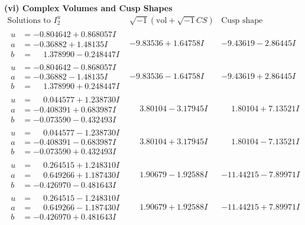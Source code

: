 \documentclass[1p]{elsarticle_modified}
\theoremstyle{definition}
\newcommand{\I}{\sqrt{-1}}
\begin{document}
\newpage\flushleft \textbf{(vi) Complex Volumes and Cusp Shapes}
$$\begin{array}{c|c|c}  
\text{Solutions to }I^u_{2}& \I (\text{vol} + \sqrt{-1}CS) & \text{Cusp shape}\\
 \hline 
\begin{aligned}
u &= -0.804642 + 0.868057 I \\
a &= -0.36882 + 1.48135 I \\
b &= \phantom{-}1.378990 - 0.248447 I\end{aligned}
 & -9.83536 + 1.64758 I & -9.43619 - 2.86445 I \\ \hline\begin{aligned}
u &= -0.804642 - 0.868057 I \\
a &= -0.36882 - 1.48135 I \\
b &= \phantom{-}1.378990 + 0.248447 I\end{aligned}
 & -9.83536 - 1.64758 I & -9.43619 + 2.86445 I \\ \hline\begin{aligned}
u &= \phantom{-}0.044577 + 1.238730 I \\
a &= -0.408391 + 0.683987 I \\
b &= -0.073590 - 0.432493 I\end{aligned}
 & \phantom{-}3.80104 - 3.17945 I & \phantom{-}1.80104 + 7.13521 I \\ \hline\begin{aligned}
u &= \phantom{-}0.044577 - 1.238730 I \\
a &= -0.408391 - 0.683987 I \\
b &= -0.073590 + 0.432493 I\end{aligned}
 & \phantom{-}3.80104 + 3.17945 I & \phantom{-}1.80104 - 7.13521 I \\ \hline\begin{aligned}
u &= \phantom{-}0.264515 + 1.248310 I \\
a &= \phantom{-}0.649266 + 1.187430 I \\
b &= -0.426970 - 0.481643 I\end{aligned}
 & \phantom{-}1.90679 - 1.92588 I & -11.44215 - 7.89971 I \\ \hline\begin{aligned}
u &= \phantom{-}0.264515 - 1.248310 I \\
a &= \phantom{-}0.649266 - 1.187430 I \\
b &= -0.426970 + 0.481643 I\end{aligned}
 & \phantom{-}1.90679 + 1.92588 I & -11.44215 + 7.89971 I \\ \hline\begin{aligned}

\end{aligned}
\end{array}$$
\end{document}
